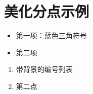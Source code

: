 \documentclass{article}
\begin{document}
\section{美化分点示例}
\begin{itemize}
    \item 第一项：蓝色三角符号
    \item 第二项
\end{itemize}

\begin{tcolorbox}[
    colback=yellow!10,
    colframe=red!50,
    title=高级分点盒子
]
\begin{enumerate}[label=(\alph*)]
    \item 带背景的编号列表
    \item 第二点
\end{enumerate}
\end{tcolorbox}
\end{document}
